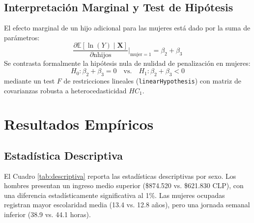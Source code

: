 \documentclass[11pt,a4paper]{article}
\begin{document}
\subsection{Interpretación Marginal y Test de Hipótesis}
El efecto marginal de un hijo adicional para las mujeres está dado por la suma de parámetros:
\begin{equation}
    \frac{\partial \mathbb{E}[\ln(Y) \mid \mathbf{X}]}{\partial \text{nhijos}} \Bigg|_{\text{mujer}=1} = \beta_2 + \beta_3
\end{equation}
Se contrasta formalmente la hipótesis nula de nulidad de penalización en mujeres:
\begin{equation*}
    H_0: \beta_2 + \beta_3 = 0 \quad \text{vs.} \quad H_1: \beta_2 + \beta_3 < 0
\end{equation*}
mediante un test $F$ de restricciones lineales (\texttt{linearHypothesis}) con matriz de covarianzas robusta a heterocedasticidad $HC_1$.

\section{Resultados Empíricos}

\subsection{Estadística Descriptiva}
El Cuadro \ref{tab:descriptiva} reporta las estadísticas descriptivas por sexo. Los hombres presentan un ingreso medio superior (\$874.520 vs. \$621.830 CLP), con una diferencia estadísticamente significativa al 1\%. Las mujeres ocupadas registran mayor escolaridad media (13.4 vs. 12.8 años), pero una jornada semanal inferior (38.9 vs. 44.1 horas).
\end{document}
